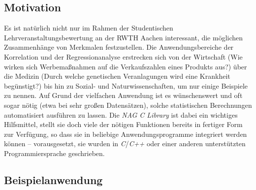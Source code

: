 \subsection{Motivation}

Es ist natürlich nicht nur im Rahmen der Studentischen Lehrveranstaltungsbewertung an der RWTH Aachen interessant, die möglichen Zusammenhänge von Merkmalen festzustellen. Die Anwendungsbereiche der Korrelation und der Regressionanalyse erstrecken sich von der Wirtschaft (Wie wirken sich Werbemaßnahmen auf die Verkaufszahlen eines Produkts aus?) über die Medizin (Durch welche genetischen Veranlagungen wird eine Krankheit begünstigt?) bis hin zu Sozial- und Naturwissenschaften, um nur einige Beispiele zu nennen. Auf Grund der vielfachen Anwendung ist es wünschenswert und oft sogar nötig (etwa bei sehr großen Datensätzen), solche statistischen Berechnungen automatisiert ausführen zu lassen. Die {\it NAG C Library} ist dabei ein wichtiges Hilfsmittel, stellt sie doch viele der nötigen Funktionen bereits in fertiger Form zur Verfügung, so dass sie in beliebige Anwendungsprogramme integriert werden können -- vorausgesetzt, sie wurden in {\it C}/{\it C++} oder einer anderen unterstützten Programmiersprache geschrieben.

\subsection{Beispielanwendung}
\label{Beispielanwendung}

\begin{comment}
Erklärung der Beispielanwendung.
Ziel?
Woher kamen die Daten?
Referenz aufs Buch?
\end{comment}
